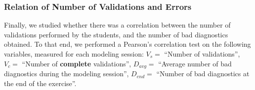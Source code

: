 


\subsubsection{Relation of Number of Validations and Errors}

Finally, we studied whether there was a correlation between the number of
validations performed by the students, and the number of bad diagnostics
obtained. To that end, we performed a Pearson's correlation test on the
following variables, measured for each modeling session: $V_s =$ ``Number of
validations'', $V_c =$ ``Number of \textbf{complete} validations'', $D_{avg} =$
``Average number of bad diagnostics during the modeling session'', $D_{end} =$
``Number of bad diagnostics at the end of the exercise''.


